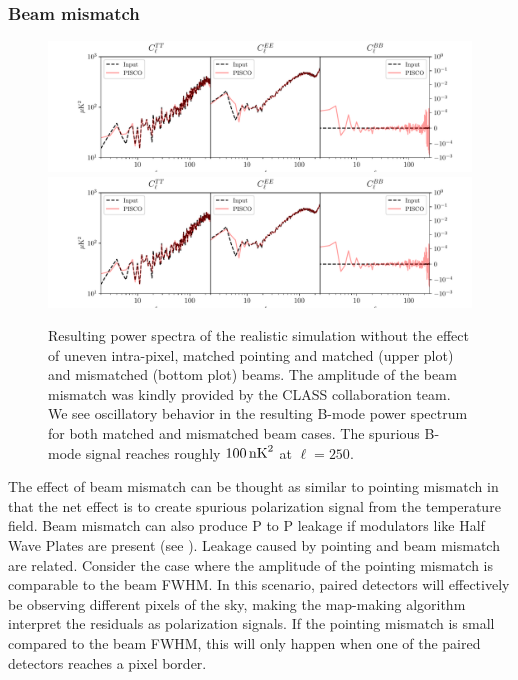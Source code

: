 \documentclass[a4paper,11pt]{article}
\begin{document}
\subsubsection{Beam mismatch}

\begin{figure}
	\centering
	\includegraphics[width=1\textwidth]{figures/cmb_r0d00_CLASS_forcedPointing_matchedBeams_ellipticalBeams.pdf}
	\includegraphics[width=1\textwidth]{figures/cmb_r0d00_CLASS_forcedPointing_mismatchedBeams_ellipticalBeams.pdf}
	\caption{Resulting power spectra of the realistic simulation without the effect of uneven intra-pixel, matched pointing and matched (upper plot) and mismatched (bottom plot) beams. The amplitude of the beam mismatch was kindly provided by the CLASS collaboration team. We see oscillatory behavior in the resulting B-mode power spectrum for both matched and mismatched beam cases. The spurious B-mode signal reaches roughly $100\, \rm{nK}^2$ at $\ell=250$.}
	\label{fig::pisco4class_beammismatch}
\end{figure}

The effect of beam mismatch can be thought as similar to pointing mismatch in that the net effect is to create spurious polarization signal from the temperature field. Beam mismatch can also produce P to P leakage if modulators like Half Wave Plates are present (see \cite{2007MNRAS.376.1767O}). Leakage caused by pointing and beam mismatch are related. Consider the case where the amplitude of the pointing mismatch is comparable to the beam FWHM. In this scenario, paired detectors will effectively be observing different pixels of the sky, making the map-making algorithm interpret the residuals as polarization signals. If the pointing mismatch is small compared to the beam FWHM, this will only happen when one of the paired detectors reaches a pixel border. 
\end{document}
